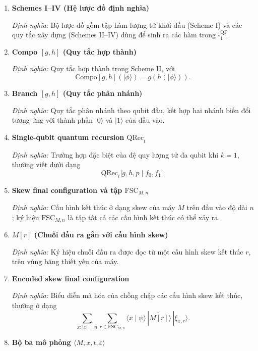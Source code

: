 \documentclass[12pt,a4paper]{article}
\begin{document}
\begin{enumerate}[leftmargin=*,itemsep=0.8em]
\textit{Định nghĩa:} Số lần tối thiểu cần áp dụng các schema (hàm khởi đầu và quy tắc xây dựng) để tạo ra hàm đích hoặc hàm xấp xỉ theo tiêu chuẩn của bài báo.

\item \textbf{Schemes I--IV (Hệ lược đồ định nghĩa)}

\textit{Định nghĩa:} Bộ lược đồ gồm tập hàm lượng tử khởi đầu (Scheme I) và các quy tắc xây dựng (Schemes II--IV) dùng để sinh ra các hàm trong $\square_{1}^{\mathrm{QP}}$.

\item \textbf{Compo $[g,h]$ (Quy tắc hợp thành)}

\textit{Định nghĩa:} Quy tắc hợp thành trong Scheme II, với
\[
\mathrm{Compo}[g,h](|\phi\rangle)=g(h(|\phi\rangle)).
\]

\item \textbf{Branch $[g,h]$ (Quy tắc phân nhánh)}

\textit{Định nghĩa:} Quy tắc phân nhánh theo qubit đầu, kết hợp hai nhánh biến đổi tương ứng với thành phần $|0\rangle$ và $|1\rangle$ của đầu vào.

\item \textbf{Single-qubit quantum recursion $\mathrm{QRec}_t$}

\textit{Định nghĩa:} Trường hợp đặc biệt của đệ quy lượng tử đa qubit khi $k=1$, thường viết dưới dạng
\[
\mathrm{QRec}_t\bigl[g,h,p\mid f_0,f_1\bigr].
\]

\item \textbf{Skew final configuration và tập $\mathrm{FSC}_{M,n}$}

\textit{Định nghĩa:} Cấu hình kết thúc ở dạng skew của máy $M$ trên đầu vào độ dài $n$; ký hiệu $\mathrm{FSC}_{M,n}$ là tập tất cả các cấu hình kết thúc có thể xảy ra.

\item \textbf{$M[r]$ (Chuỗi đầu ra gắn với cấu hình skew)}

\textit{Định nghĩa:} Ký hiệu chuỗi đầu ra được đọc từ một cấu hình skew kết thúc $r$, trên vùng băng thiết yếu của máy.

\item \textbf{Encoded skew final configuration}

\textit{Định nghĩa:} Biểu diễn mã hóa của chồng chập các cấu hình skew kết thúc, thường ở dạng
\[
\sum_{x:|x|=n}\sum_{r\in\mathrm{FSC}_{M,n}}\langle x\mid\psi\rangle\,|\widetilde{M[r]}\rangle\,|\xi_{x,r}\rangle.
\]

\item \textbf{Bộ ba mô phỏng $\langle M,x,t,\varepsilon\rangle$}


\end{enumerate}
\end{document}
